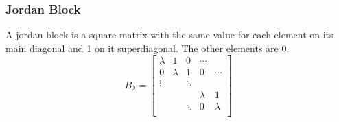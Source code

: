 \subsubsection{Jordan Block}
A jordan block is a square matrix with the same value for each element on its main diagonal and 1 on it superdiagonal. The other elements are 0.
\begin{equation*}
    B_{\lambda}  = \begin{bmatrix}
        \lambda & 1       & 0      & \cdots  &         \\
        0       & \lambda & 1      & 0       & \cdots  \\
        \vdots  &         & \ddots &         &         \\
                &         &        & \lambda & 1       \\
                &         & \ddots & 0       & \lambda \\
    \end{bmatrix}
\end{equation*}

